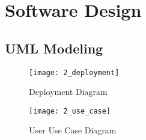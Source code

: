 \section{Software Design}
\subsection{UML Modeling}

\begin{figure}[!ht]
\centering
\texttt{[image: 2\_deployment]}
\caption{Deployment Diagram}\label{demployment}
\end{figure}

\begin{figure}[!ht]
\centering
\texttt{[image: 2\_use\_case]}
\caption{User Use Case Diagram}\label{use_case}
\end{figure}


\clearpage